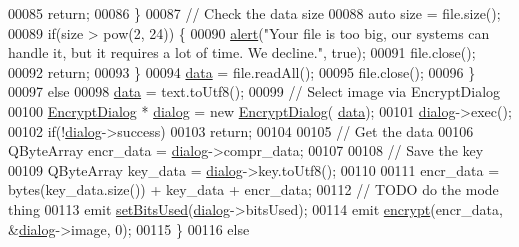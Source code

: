 \begin{DoxyCode}
00085                 \textcolor{keywordflow}{return};
00086             \}
00087             \textcolor{comment}{// Check the data size}
00088             \textcolor{keyword}{auto} size = file.size();
00089             \textcolor{keywordflow}{if}(size > pow(2, 24)) \{
00090                 \mbox{\hyperlink{class_view_p_c_a7c467169467789561078abc9d4fe57bd}{alert}}(\textcolor{stringliteral}{"Your file is too big, our systems can handle it, but it requires a lot of time.
       We decline."}, \textcolor{keyword}{true});
00091                 file.close();
00092                 \textcolor{keywordflow}{return};
00093             \}
00094             \mbox{\hyperlink{namespace_errors_dict_setup_af570460846fb9f0c91abd308a095dcdc}{data}} = file.readAll();
00095             file.close();
00096         \}
00097         \textcolor{keywordflow}{else}
00098             \mbox{\hyperlink{namespace_errors_dict_setup_af570460846fb9f0c91abd308a095dcdc}{data}} = text.toUtf8();
00099         \textcolor{comment}{// Select image via EncryptDialog}
00100         \mbox{\hyperlink{class_encrypt_dialog}{EncryptDialog}} * \mbox{\hyperlink{class_view_p_c_a31abbb470fe329b44e6ffee202b903ca}{dialog}} = \textcolor{keyword}{new} \mbox{\hyperlink{class_encrypt_dialog}{EncryptDialog}}(
      \mbox{\hyperlink{namespace_errors_dict_setup_af570460846fb9f0c91abd308a095dcdc}{data}});
00101         \mbox{\hyperlink{class_view_p_c_a31abbb470fe329b44e6ffee202b903ca}{dialog}}->exec();
00102         \textcolor{keywordflow}{if}(!\mbox{\hyperlink{class_view_p_c_a31abbb470fe329b44e6ffee202b903ca}{dialog}}->success)
00103             \textcolor{keywordflow}{return};
00104 
00105         \textcolor{comment}{// Get the data}
00106         QByteArray encr\_data = \mbox{\hyperlink{class_view_p_c_a31abbb470fe329b44e6ffee202b903ca}{dialog}}->compr\_data;
00107 
00108         \textcolor{comment}{// Save the key}
00109         QByteArray key\_data = \mbox{\hyperlink{class_view_p_c_a31abbb470fe329b44e6ffee202b903ca}{dialog}}->key.toUtf8();
00110 
00111         encr\_data = bytes(key\_data.size()) + key\_data + encr\_data;
00112         \textcolor{comment}{// TODO do the mode thing}
00113         emit \mbox{\hyperlink{class_view_p_c_a2ccc0a3f2f48080ae6308e800646fcd5}{setBitsUsed}}(\mbox{\hyperlink{class_view_p_c_a31abbb470fe329b44e6ffee202b903ca}{dialog}}->bitsUsed);
00114         emit \mbox{\hyperlink{class_view_p_c_ade35449b95cf1c5424c4eb929f46fd73}{encrypt}}(encr\_data, &\mbox{\hyperlink{class_view_p_c_a31abbb470fe329b44e6ffee202b903ca}{dialog}}->image, 0);
00115     \}
00116     \textcolor{keywordflow}{else}

\end{DoxyCode}
